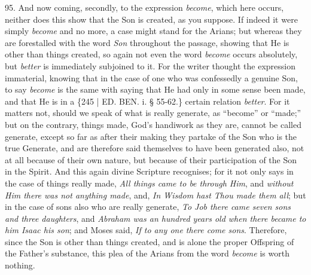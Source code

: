 95. And now coming, secondly,
to the expression \emph{become}, which here occurs, neither does this
show that the Son is created, as you suppose. If indeed it were simply
\emph{become} and no more, a case might stand for the Arians; but
whereas they are forestalled with the word \emph{Son} throughout the
passage, showing that He is other than things created, so again not
even the word \emph{become} occurs absolutely, but \emph{better} is
immediately subjoined to it. For the writer thought the expression
immaterial, knowing that in the case of one who was confessedly a
genuine Son, to say \emph{become} is the same with saying that He had
only in some sense been made, and that He is in a \{245 | ED.
BEN.
i. § 55-62.\} certain relation \emph{better}. For it matters not,
should we speak of what is really generate, as ``become'' or ``made;'' but
on the contrary, things made, God's handiwork as they are, cannot be
called generate, except so far as after their making they partake of
the Son who is the true Generate, and are therefore said themselves to
have been generated also, not at all because of their own nature, but
because of their participation of the Son in the Spirit. And this
again divine Scripture recognises; for it not only says in the case of
things really made, \emph{All things came to be through Him}, and \emph{without
Him there was not anything made}, and, \emph{In Wisdom hast Thou made
them all}; but in the case of sons also who are really generate, \emph{To
Job there came seven sons and three daughters}, and \emph{Abraham was
an hundred years old when there became to him Isaac his son}; and
Moses said, \emph{If to any one there come sons}. Therefore, since the
Son is other than things created, and is alone the proper Offspring of
the Father's substance, this plea of the Arians from the word \emph{become}
is worth nothing.

